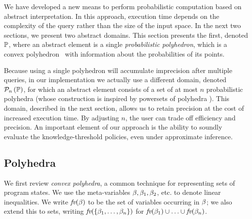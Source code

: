 
We have developed a new means to perform probabilistic computation
based on abstract interpretation.  In this approach, execution time
depends on the complexity of the query rather than the size of the
input space.  In the next two sections, we present two abstract
domains.  This section presents the first, denoted $\mathbb{P}$, where an
abstract element is a single \emph{probabilistic polyhedron}, which is
a convex polyhedron~\cite{CousotHalbwachs78-POPL} with information
about the probabilities of its points. 

Because using a single polyhedron will accumulate imprecision after
multiple queries, in our implementation we actually use a different
domain, denoted $ \mathcal{P}_{n}\left( \mathbb{P} \right) $, for which an abstract element consists
of a set of at most $n$ probabilistic polyhedra (whose construction is
inspired by powersets of polyhedra
\cite{bagnara06powerset,Popeea06inferringdisjunctive}).  This domain,
described in the next section, allows us to retain precision at the
cost of increased execution time.  By adjusting $n$, the user can
trade off efficiency and precision. An important element of our
approach is the ability to soundly evaluate the knowledge-threshold
policies, even under approximate inference.

\subsection{Polyhedra} \label{sec:polyhedra}

We first review \emph{convex polyhedra}, a common technique for representing sets of program states.  We use the meta-variables $\beta, \beta_1, \beta_2$, etc. to denote linear inequalities.  We write $\textit{fv}(\beta)$ to be the set of variables occurring in
$\beta$; we also extend this to sets, writing $\textit{fv}(\{\beta_1,\ldots,\beta_n\})$ for $\textit{fv}(\beta_1) \cup \ldots \cup \textit{fv}(\beta_n)$.

